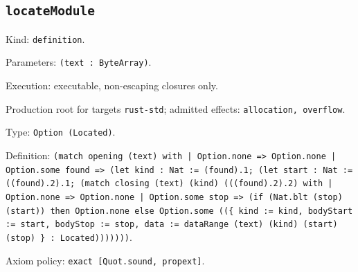 \documentclass[11pt]{article}
\begin{document}
\subsection*{\texttt{locateModule}}
\noindent Kind: \texttt{definition}.\par
\noindent Parameters: \texttt{(text : ByteArray)}.\par
\noindent Execution: executable, non-escaping closures only.\par
\noindent Production root for targets \texttt{rust-std}; admitted effects: \texttt{allocation, overflow}.\par
\noindent Type: \texttt{Option (Located)}.\par
\noindent Definition: \texttt{(match opening (text) with | Option.none => Option.none | Option.some found => (let kind : Nat := (found).1; (let start : Nat := ((found).2).1; (match closing (text) (kind) (((found).2).2) with | Option.none => Option.none | Option.some stop => (if (Nat.blt (stop) (start)) then Option.none else Option.some ((\{ kind := kind, bodyStart := start, bodyStop := stop, data := dataRange (text) (kind) (start) (stop) \} : Located)))))))}.\par
\noindent Axiom policy: \texttt{exact [Quot.sound, propext]}.\par
\end{document}
